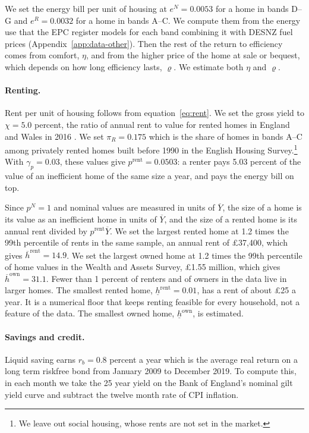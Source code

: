 We set the energy bill per unit of housing at $e^N=0.0053$ for a home in bands
D--G and $e^R=0.0032$ for a home in bands A--C. We compute them from the
energy use that the EPC register models for each band combining it with DESNZ fuel
prices (Appendix~\ref{app:data-other}). Then the rest of the
return to efficiency comes from comfort, $\eta$, and from the higher price
of the home at sale or bequest, which depends on how long efficiency lasts,
$\varrho$. We estimate both $\eta$ and $\varrho$.

\paragraph{Renting.}
Rent per unit of housing follows from equation~\eqref{eq:rent}. We set the
gross yield to $\chi=5.0$ percent, the ratio of annual rent to value for
rented homes in England and Wales in 2016 \citep[Annex 2, Table
A.3]{boe2017fsr}. We set $\pi_R=0.175$ which is the share of
homes in bands A--C among privately rented homes built before 1990 in the
English Housing Survey.\footnote{
We leave out social housing, whose rents are not set in the market.} With
$\gamma_p=0.03$, these values give $p^{\mathrm{rent}}=0.0503$: a renter pays
5.03 percent of the value of an inefficient home of the same size a year,
and pays the energy bill on top.

Since $p^N=1$ and nominal values are  measured in units of $\overline Y$, the size of
a home is its value as an inefficient home in units of $\overline Y$, and
the size of a rented home is its annual rent divided by
$p^{\mathrm{rent}}\overline Y$. We set the largest rented home at 1.2 times
the 99th percentile of rents in the same sample, an annual rent of
\pounds37,400, which gives $\overline h^{\mathrm{rent}}=14.9$. We set the
largest owned home at 1.2 times the 99th percentile of home values in the
Wealth and Assets Survey, \pounds1.55 million, which gives
$\overline h^{\mathrm{own}}=31.1$. Fewer than 1 percent of renters and of
owners in the data live in larger homes. The smallest rented home,
$\underline h^{\mathrm{rent}}=0.01$, has a rent of about \pounds25 a year.
It is a numerical floor that keeps renting feasible for every household,
not a feature of the data. The smallest owned home,
$\underline h^{\mathrm{own}}$, is estimated.

\paragraph{Savings and credit.}
Liquid saving earns $r_b=0.8$ percent a year which is the average real return on a
long term riskfree bond from January 2009 to December 2019. To compute this, in each month we take the 25 year yield on the Bank of
England's nominal gilt yield curve and subtract the twelve month rate of
CPI inflation.  

